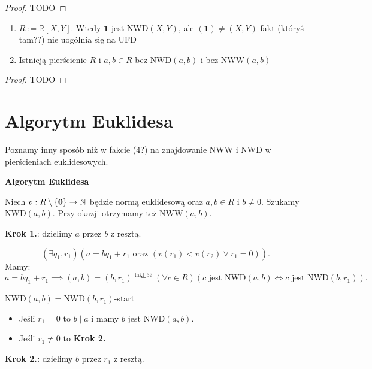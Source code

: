 \begin{proof}
	TODO
\end{proof} 
\begin{remark}
	\begin{enumerate}[label=\arabic*)]
		\item $R:=\mathbb{R} \left[ X,Y \right] $. Wtedy $\mathbf{1}$ jest $\text{NWD}\left( X,Y \right) $, ale $\left( \mathbf{1} \right) \neq \left( X,Y \right) $ fakt (któryś tam??) nie uogólnia się na UFD
		\item Istnieją pierścienie $R$ i $a,b \in R$ bez $\text{NWD}\left( a,b \right) $ i bez $\text{NWW}\left( a,b \right) $ 
	\end{enumerate}
\end{remark} 
\begin{proof}
	TODO
\end{proof} 
\section{Algorytm Euklidesa}

Poznamy inny sposób niż w fakcie (4?) na znajdowanie NWW i NWD w pierścieniach euklidesowych.

\noindent \textbf{Algorytm Euklidesa} 

Niech $v: R\setminus \{\mathbf{0}\} \to \mathbb{N}$ będzie normą euklidesową oraz $a,b\in R$ i $b\neq 0$. Szukamy $\text{NWD}\left( a,b \right) $. Przy okazji otrzymamy też $\text{NWW}\left( a,b \right) $.

\noindent \textbf{Krok 1.}: dzielimy $a$ przez $b$ z resztą.

\[
\left(\exists q_1,r_1 \right)\left( a=bq_1+r_1 \text{ oraz } \left( v\left( r_1 \right) < v\left( r_2 \right) \lor r_1 = 0 \right) \right)  
.\] 
Mamy:
\[
a = bq_1+r_1 \implies \left( a,b \right) = \left( b,r_1 \right) \overset{\text{fakt 3?}}{=} \left(\forall c\in R \right)\left( c \text{ jest }\text{NWD}\left( a,b \right) \iff c \text{ jest } \text{NWD}\left( b,r_1 \right)  \right)  
.\] 

$\text{NWD}\left( a,b \right) = \text{NWD}\left( b,r_1 \right) $-start
\begin{itemize}
	\item Jeśli $r_1 = 0 $ to $b\mid a$ i mamy $b$ jest $\text{NWD}\left( a,b \right) $.
	\item Jeśli $r_1\neq 0$ to \textbf{Krok 2.} 
\end{itemize}

\noindent \textbf{Krok 2.:} dzielimy $b$ przez $r_1$ z resztą.

